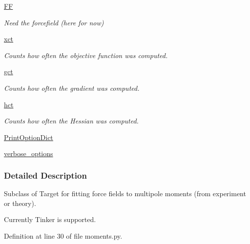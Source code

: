 \begin{DoxyCompactItemize}
\hyperlink{classforcebalance_1_1target_1_1Target_a38a37919783141ea37fdcf8b00ce0aaf}{F\-F}
\begin{DoxyCompactList}\small\item\em Need the forcefield (here for now) \end{DoxyCompactList}\item 
\hyperlink{classforcebalance_1_1target_1_1Target_aad2e385cfbf7b4a68f1c2cb41133fe82}{xct}
\begin{DoxyCompactList}\small\item\em Counts how often the objective function was computed. \end{DoxyCompactList}\item 
\hyperlink{classforcebalance_1_1target_1_1Target_aa625ac88c6744eb14ef281d9496d0dbb}{gct}
\begin{DoxyCompactList}\small\item\em Counts how often the gradient was computed. \end{DoxyCompactList}\item 
\hyperlink{classforcebalance_1_1target_1_1Target_a5b5a42f78052b47f29ed4b940c6111a1}{hct}
\begin{DoxyCompactList}\small\item\em Counts how often the Hessian was computed. \end{DoxyCompactList}\item 
\hyperlink{classforcebalance_1_1baseclass_1_1ForceBalanceBaseClass_a5c55e661e746d1a4443f4e0bc34ebe05}{Print\-Option\-Dict}
\item 
\hyperlink{classforcebalance_1_1baseclass_1_1ForceBalanceBaseClass_a8088e1e20cbd6bc175fb9c9fe9fa0f18}{verbose\-\_\-options}
\end{DoxyCompactItemize}


\subsubsection{Detailed Description}
Subclass of Target for fitting force fields to multipole moments (from experiment or theory). 

Currently Tinker is supported. 

Definition at line 30 of file moments.\-py.



